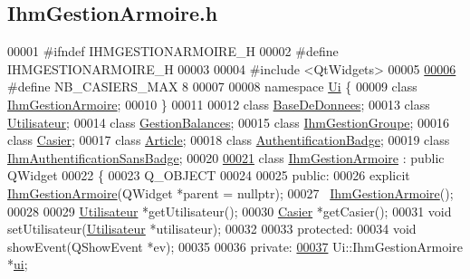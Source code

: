 \hypertarget{_ihm_gestion_armoire_8h_source}{}\subsection{Ihm\+Gestion\+Armoire.\+h}
\label{_ihm_gestion_armoire_8h_source}

\begin{DoxyCode}
00001 \textcolor{preprocessor}{#ifndef IHMGESTIONARMOIRE\_H}
00002 \textcolor{preprocessor}{#define IHMGESTIONARMOIRE\_H}
00003 
00004 \textcolor{preprocessor}{#include <QtWidgets>}
00005 
\hyperlink{_ihm_gestion_armoire_8h_a3b50ad4bb3a6d50ae49c854487628ce5}{00006} \textcolor{preprocessor}{#define NB\_CASIERS\_MAX  8}
00007 
00008 \textcolor{keyword}{namespace }\hyperlink{namespace_ui}{Ui} \{
00009 \textcolor{keyword}{class }\hyperlink{class_ihm_gestion_armoire}{IhmGestionArmoire};
00010 \}
00011 
00012 \textcolor{keyword}{class }\hyperlink{class_base_de_donnees}{BaseDeDonnees};
00013 \textcolor{keyword}{class }\hyperlink{class_utilisateur}{Utilisateur};
00014 \textcolor{keyword}{class }\hyperlink{class_gestion_balances}{GestionBalances};
00015 \textcolor{keyword}{class }\hyperlink{class_ihm_gestion_groupe}{IhmGestionGroupe};
00016 \textcolor{keyword}{class }\hyperlink{class_casier}{Casier};
00017 \textcolor{keyword}{class }\hyperlink{class_article}{Article};
00018 \textcolor{keyword}{class }\hyperlink{class_authentification_badge}{AuthentificationBadge};
00019 \textcolor{keyword}{class }\hyperlink{class_ihm_authentification_sans_badge}{IhmAuthentificationSansBadge};
00020 
\hyperlink{class_ihm_gestion_armoire}{00021} \textcolor{keyword}{class }\hyperlink{class_ihm_gestion_armoire}{IhmGestionArmoire} : \textcolor{keyword}{public} QWidget
00022 \{
00023     Q\_OBJECT
00024 
00025 \textcolor{keyword}{public}:
00026     \textcolor{keyword}{explicit} \hyperlink{class_ihm_gestion_armoire}{IhmGestionArmoire}(QWidget *parent = \textcolor{keyword}{nullptr});
00027     ~\hyperlink{class_ihm_gestion_armoire}{IhmGestionArmoire}();
00028 
00029     \hyperlink{class_utilisateur}{Utilisateur} *getUtilisateur();
00030     \hyperlink{class_casier}{Casier} *getCasier();
00031     \textcolor{keywordtype}{void} setUtilisateur(\hyperlink{class_utilisateur}{Utilisateur} *utilisateur);
00032 
00033 \textcolor{keyword}{protected}:
00034       \textcolor{keywordtype}{void} showEvent(QShowEvent *ev);
00035 
00036 \textcolor{keyword}{private}:
\hyperlink{class_ihm_gestion_armoire_a793a2816dc21b3161566138d2af5a8b9}{00037}     Ui::IhmGestionArmoire *\hyperlink{class_ihm_gestion_armoire_a793a2816dc21b3161566138d2af5a8b9}{ui}; 

\end{DoxyCode}
